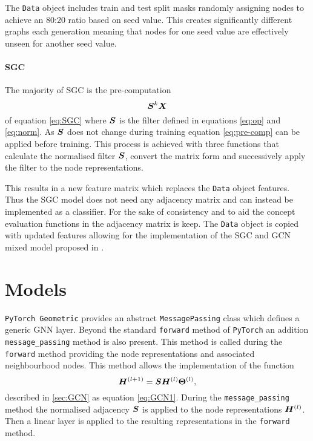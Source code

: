 The \texttt{Data} object includes train and test split masks randomly assigning nodes to achieve an 80:20 ratio based on seed value.
This 
creates significantly different graphs each generation
meaning that nodes for one seed value are effectively unseen for another seed value.

\paragraph{SGC}
The majority of SGC is the pre-computation
\begin{equation}
    \label{eq:pre-comp}
    {\bm{S}}^k{\bm{X}}
\end{equation}
of equation \ref{eq:SGC} where ${\bm{S}}$ is the filter defined in equations \ref{eq:op} and \ref{eq:norm}.
As ${\bm{S}}$ 
does not change during training equation \ref{eq:pre-comp} can be applied before training.
This process is achieved with three functions that calculate the normalised filter ${\bm{S}}$,
convert the matrix form and successively apply the filter to the node representations.

This results in a new feature matrix which replaces the \texttt{Data} object features.
Thus the SGC model does not need any adjacency matrix and can instead be implemented as a classifier.
For the sake of consistency and to aid the concept evaluation functions in  the adjacency matrix is keep.
The \texttt{Data} object is copied with updated features allowing for the implementation of the SGC and GCN mixed model proposed in .

\section{Models}
\label{sec:models}

\texttt{PyTorch Geometric} provides an abstract \texttt{MessagePassing} class which defines a generic GNN layer.
Beyond the standard \texttt{forward} method of \texttt{PyTorch}\cite{paszke2019pytorch} an addition \texttt{message\_passing} method is also present.
This method is called during the \texttt{forward} method providing the node representations and associated neighbourhood nodes.
This method allows the implementation of the function
\begin{equation}
    {\bm{H}}^{(l+1)} = {\bm{S}}{\bm{H}}^{(l)}\bm{\Theta}^{(l)},
\end{equation}
described in \ref{sec:GCN} as equation \ref{eq:GCN1}.
During the \texttt{message\_passing} method the normalised adjacency ${\bm{S}}$ is applied to the node representations ${\bm{H}}^{(l)}$.
Then a linear layer is applied to the resulting representations in the \texttt{forward} method.

